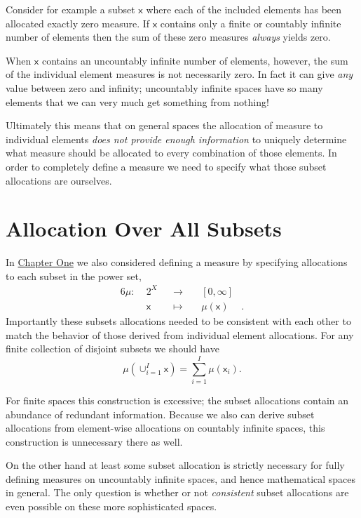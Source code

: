 \documentclass[
  letterpaper,
  DIV=11,
  numbers=noendperiod]{scrartcl}
\begin{document}
Consider for example a subset \(\mathsf{x}\) where each of the included
elements has been allocated exactly zero measure. If \(\mathsf{x}\)
contains only a finite or countably infinite number of elements then the
sum of these zero measures \emph{always} yields zero.

When \(\mathsf{x}\) contains an uncountably infinite number of elements,
however, the sum of the individual element measures is not necessarily
zero. In fact it can give \emph{any} value between zero and infinity;
uncountably infinite spaces have so many elements that we can very much
get something from nothing!

Ultimately this means that on general spaces the allocation of measure
to individual elements \emph{does not provide enough information} to
uniquely determine what measure should be allocated to every combination
of those elements. In order to completely define a measure we need to
specify what those subset allocations are ourselves.

\hypertarget{allocation-over-all-subsets}{%
\section{Allocation Over All
Subsets}\label{allocation-over-all-subsets}}

In
\href{https://betanalpha.github.io/assets/chapters_html/probability_on_finite_sets.html}{Chapter
One} we also considered defining a measure by specifying allocations to
each subset in the power set, \begin{alignat*}{6}
\mu :\; & 2^{X} & &\rightarrow& \; & [0, \infty] &
\\
& \mathsf{x} & &\mapsto& & \mu(\mathsf{x}) &.
\end{alignat*} Importantly these subsets allocations needed to be
consistent with each other to match the behavior of those derived from
individual element allocations. For any finite collection of disjoint
subsets we should have \[
\mu( \cup_{i = 1}^{I} \mathsf{x} )
=
\sum_{i = 1}^{I} \mu( \mathsf{x}_{i}).
\]

For finite spaces this construction is excessive; the subset allocations
contain an abundance of redundant information. Because we also can
derive subset allocations from element-wise allocations on countably
infinite spaces, this construction is unnecessary there as well.

On the other hand at least some subset allocation is strictly necessary
for fully defining measures on uncountably infinite spaces, and hence
mathematical spaces in general. The only question is whether or not
\emph{consistent} subset allocations are even possible on these more
sophisticated spaces.
\end{document}
